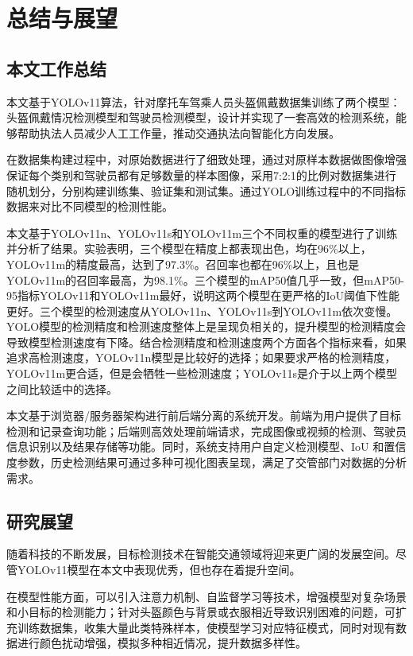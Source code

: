 
\chapter{总结与展望}

\section{本文工作总结}
本文基于YOLOv11算法，针对摩托车驾乘人员头盔佩戴数据集训练了两个模型：头盔佩戴情况检测模型和驾驶员检测模型，设计并实现了一套高效的检测系统，能够帮助执法人员减少人工工作量，推动交通执法向智能化方向发展。

在数据集构建过程中，对原始数据进行了细致处理，通过对原样本数据做图像增强保证每个类别和驾驶员都有足够数量的样本图像，采用7:2:1的比例对数据集进行随机划分，分别构建训练集、验证集和测试集。通过YOLO训练过程中的不同指标数据来对比不同模型的检测性能。

本文基于YOLOv11n、YOLOv11s和YOLOv11m三个不同权重的模型进行了训练并分析了结果。实验表明，三个模型在精度上都表现出色，均在96\%以上，YOLOv11m的精度最高，达到了97.3\%。召回率也都在96\%以上，且也是YOLOv11m的召回率最高，为98.1\%。三个模型的mAP50值几乎一致，但mAP50-95指标YOLOv11和YOLOv11m最好，说明这两个模型在更严格的IoU阈值下性能更好。三个模型的检测速度从YOLOv11n、YOLOv11s到YOLOv11m依次变慢。YOLO模型的检测精度和检测速度整体上是呈现负相关的，提升模型的检测精度会导致模型检测速度有下降。结合检测精度和检测速度两个方面各个指标来看，如果追求高检测速度，YOLOv11n模型是比较好的选择；如果要求严格的检测精度，YOLOv11m更合适，但是会牺牲一些检测速度；YOLOv11s是介于以上两个模型之间比较适中的选择。

本文基于浏览器/服务器架构进行前后端分离的系统开发。前端为用户提供了目标检测和记录查询功能；后端则高效处理前端请求，完成图像或视频的检测、驾驶员信息识别以及结果存储等功能。同时，系统支持用户自定义检测模型、IoU 和置信度参数，历史检测结果可通过多种可视化图表呈现，满足了交管部门对数据的分析需求。

\section{研究展望}
随着科技的不断发展，目标检测技术在智能交通领域将迎来更广阔的发展空间。尽管YOLOv11模型在本文中表现优秀，但也存在着提升空间。

在模型性能方面，可以引入注意力机制、自监督学习等技术，增强模型对复杂场景和小目标的检测能力；针对头盔颜色与背景或衣服相近导致识别困难的问题，可扩充训练数据集，收集大量此类特殊样本，使模型学习对应特征模式，同时对现有数据进行颜色扰动增强，模拟多种相近情况，提升数据多样性。

